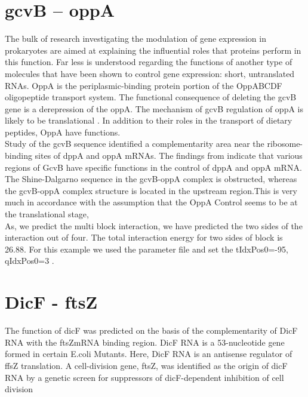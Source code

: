 \documentclass[twoside,a4paper]{report}
\begin{document}
	  \section{gcvB – oppA }
	  The bulk of research investigating the modulation of gene expression in prokaryotes are aimed at explaining the influential roles that proteins perform in this function. Far less is understood regarding the functions of another type of molecules that have been shown to control gene expression: short, untranslated RNAs. OppA is the periplasmic-binding protein portion of the OppABCDF oligopeptide transport system. The functional consequence of deleting the gcvB gene is a derepression of the oppA. The mechanism of gcvB regulation of oppA is likely to be translational \citep{urbanowski2000gcvb}. In addition to their roles in the transport of dietary peptides, OppA have functions.\\
	  
	  Study of the gcvB sequence identified a complementarity area near the ribosome-binding sites of dppA and oppA mRNAs. The findings from {\citep{pulvermacher2008role}} indicate that various regions of GcvB have specific functions in the control of dppA and oppA mRNA. The Shine-Dalgarno sequence in the gcvB-oppA complex is obstructed, whereas the gcvB-oppA complex structure is located in the upstream region.This is very much in accordance with the assumption that the OppA Control seems to be at the translational stage, \\
	  
	As, we predict the multi block interaction, we have predicted the two sides of the interaction out of four. The total interaction energy for two sides of block is 26.88. For this example we used the parameter file and set the tIdxPos0=-95, 
	qIdxPos0=3 . \\
	
	 \section{DicF - ftsZ }
	 The function of dicF was predicted on the basis of the complementarity of DicF RNA with the ftsZmRNA binding region. DicF RNA is a 53-nucleotide gene formed in certain E.coli Mutants. Here, DicF RNA is an antisense regulator of ffsZ translation. A cell-division gene, ftsZ, was identified as the origin of dicF RNA by a genetic screen for suppressors of dicF-dependent inhibition of cell division ~\citep{tetart1992regulation}\\
	 
\end{document}

